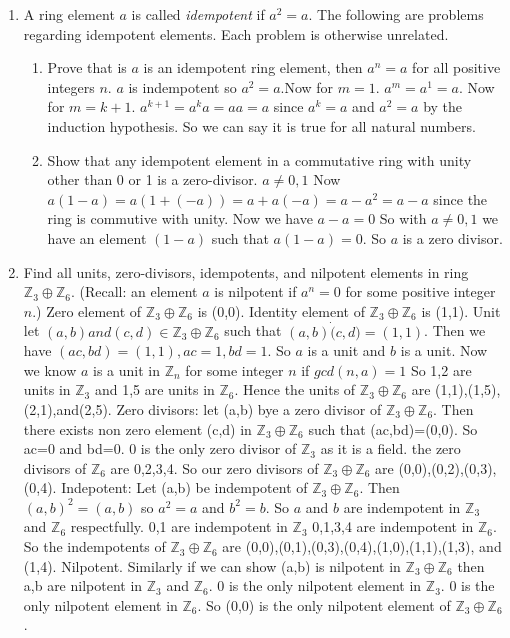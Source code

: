 \documentclass{article}
\newcommand{\ZZ}{\mathbb{Z}}
\begin{document}


\begin{enumerate}

 \item A ring element $a$ is called \emph{idempotent} if $a^2=a$. The following are problems regarding idempotent elements. Each problem is otherwise unrelated.
    \begin{enumerate}
        \item Prove that is $a$ is an idempotent ring element, then $a^n=a$ for all positive integers $n$. $a$ is indempotent so $a^{2}=a$.Now for $m=1$. $a^{m}=a^{1}=a$. Now for $m=k+1$. $a^{k+1}=a^{k}a=aa=a$ since $a^{k}=a$ and $a^{2}=a$ by the induction hypothesis. So we can say it is true for all natural numbers. 
        
        \item Show that any idempotent element in a commutative ring with unity other than 0 or 1 is a zero-divisor. $a\neq 0,1$ Now $a(1-a)=a(1+(-a))=a+a(-a)=a-a^{2}=a-a$ since the ring is commutive with unity. Now we have $a-a=0$ So with $a\neq 0,1$ we have an element $(1-a)$ such that $a(1-a)=0$. So $a$ is a zero divisor. 

    \end{enumerate}

    \item Find all units, zero-divisors, idempotents, and nilpotent elements in ring $\ZZ_3\oplus \ZZ_6$. (Recall: an element $a$ is nilpotent if $a^n=0$ for some positive integer $n$.) Zero element of $\ZZ_3\oplus \ZZ_6$ is (0,0). Identity element of $\ZZ_3\oplus \ZZ_6$ is (1,1). Unit let $(a,b) and (c,d) \in \ZZ_3\oplus \ZZ_6$ such that $(a,b) \dot (c,d) = (1,1)$. Then we have $(ac,bd)=(1,1), ac=1, bd=1$. So $a$ is a unit and $b$ is a unit. Now we know $a$ is a unit in $\ZZ_n$ for some integer $n$ if $gcd(n,a)=1$ So 1,2 are units in $\ZZ_3$ and 1,5 are units in $\ZZ_6$. Hence the units of $\ZZ_3\oplus \ZZ_6$ are (1,1),(1,5),(2,1),and(2,5). Zero divisors: let (a,b) bye a zero divisor of $\ZZ_3\oplus \ZZ_6$. Then there exists non zero element (c,d) in $\ZZ_3\oplus \ZZ_6$ such that (ac,bd)=(0,0). So ac=0 and bd=0. 0 is the only zero divisor of $\ZZ_3$ as it is a field. the zero divisors of $\ZZ_6$ are 0,2,3,4. So our zero divisors of $\ZZ_3\oplus \ZZ_6$ are (0,0),(0,2),(0,3),(0,4). Indepotent: Let (a,b) be indempotent of $\ZZ_3\oplus \ZZ_6$. Then $(a,b)^{2}=(a,b)$ so $a^{2}=a$ and $b^{2}=b$. So $a$ and $b$ are indempotent in $\ZZ_3$ and $\ZZ_6$ respectfully. 0,1 are indempotent in $\ZZ_3$ 0,1,3,4 are indempotent in $\ZZ_6$. So the indempotents of $\ZZ_3\oplus \ZZ_6$ are (0,0),(0,1),(0,3),(0,4),(1,0),(1,1),(1,3), and (1,4). Nilpotent. Similarly if we can show (a,b) is nilpotent in $\ZZ_3\oplus \ZZ_6$ then a,b are nilpotent in $\ZZ_3$ and $\ZZ_6$. 0 is the only nilpotent element in $\ZZ_3$. 0 is the only nilpotent element in $\ZZ_6$. So (0,0) is the only nilpotent element of $\ZZ_3\oplus \ZZ_6$. 


\end{enumerate}
\end{document}
